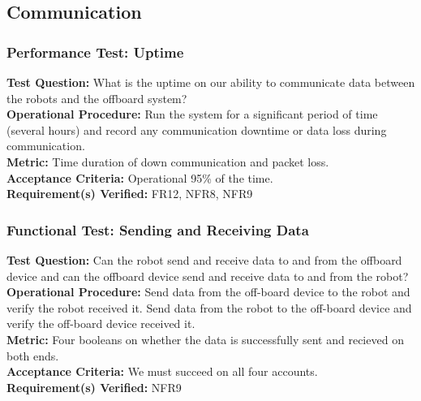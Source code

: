 
\subsection{Communication}
\label{sec:verification_comm}

\subsubsection{Performance Test: Uptime}
\label{test:comm_pt_reliability}
\textbf{Test Question:} What is the uptime on our ability to communicate data between the robots and the offboard system?  \\
\textbf{Operational Procedure:} Run the system for a significant period of time (several hours) and record any communication downtime or data loss during communication. \\
\textbf{Metric:} Time duration of down communication and packet loss. \\
\textbf{Acceptance Criteria:} Operational 95\% of the time.\\
\textbf{Requirement(s) Verified:} FR12, NFR8, NFR9 \\

\subsubsection{Functional Test: Sending and Receiving Data}
\label{test:comm_ft_send}
\textbf{Test Question:} Can the robot send and receive data to and from the offboard device and can the offboard device send and receive data to and from the robot?\\
\textbf{Operational Procedure:} Send data from the off-board device to the robot and verify the robot received it. Send data from the robot to the off-board device and verify the off-board device received it. \\
\textbf{Metric:} Four booleans on whether the data is successfully sent and recieved on both ends. \\
\textbf{Acceptance Criteria:} We must succeed on all four accounts. \\
\textbf{Requirement(s) Verified:} NFR9 \\

